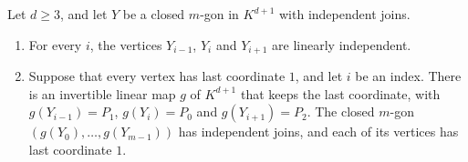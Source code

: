 \begin{lemma}
  \label{lem:pencil-d-polygon-normal}
  \leanok
  Let $d \ge 3$, and let $Y$ be a closed $m$-gon in $K^{d+1}$ with
  independent joins.
  \begin{enumerate}
    \item For every $i$, the vertices $Y_{i-1}$, $Y_i$ and $Y_{i+1}$ are
      linearly independent.
    \item Suppose that every vertex has last coordinate $1$, and let $i$
      be an index. There is an invertible linear map $g$ of $K^{d+1}$
      that keeps the last coordinate, with $g(Y_{i-1}) = P_1$,
      $g(Y_i) = P_0$ and $g(Y_{i+1}) = P_2$. The closed $m$-gon
      $(g(Y_0), \dots, g(Y_{m-1}))$ has independent joins, and each of
      its vertices has last coordinate $1$.
  \end{enumerate}
\end{lemma}
